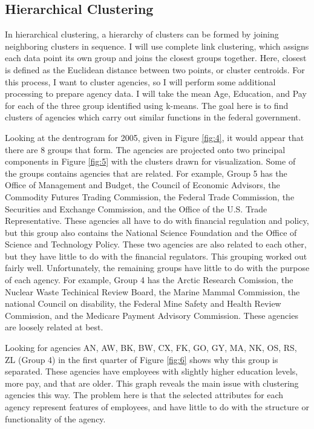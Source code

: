 \documentclass{article}
\begin{document}
    \subsection{Hierarchical Clustering}
    In hierarchical clustering, a hierarchy of clusters can be formed by joining neighboring clusters in sequence. I will use complete link clustering, which assigns each data point its own group and joins the closest groups together. Here, closest is defined as the Euclidean distance between two points, or cluster centroids. For this process, I want to cluster agencies, so I will perform some additional processing to prepare agency data. I will take the mean Age, Education, and Pay for each of the three group identified using k-means. The goal here is to find clusters of agencies which carry out similar functions in the federal government.
    \par
    Looking at the dentrogram for 2005, given in Figure \ref{fig:4}, it would appear that there are 8 groups that form. The agencies are projected onto two principal components in Figure \ref{fig:5} with the clusters drawn for visualization. Some of the groups contains agencies that are related. For example, Group 5 has the Office of Management and Budget, the Council of Economic Advisors, the Commodity Futures Trading Commission, the Federal Trade Commission, the Securities and Exchange Commission, and the Office of the U.S. Trade Representative. These agencies all have to do with financial regulation and policy, but this group also contains the National Science Foundation and the Office of Science and Technology Policy. These two agencies are also related to each other, but they have little to do with the financial regulators. This grouping worked out fairly well. Unfortunately, the remaining groups have little to do with the purpose of each agency. For example, Group 4 has the Arctic Research Comission, the Nuclear Waste Techinical Review Board, the Marine Mammal Commission, the national Council on disability, the Federal Mine Safety and Health Review Commission, and the Medicare Payment Advisory Commission. These agencies are loosely related at best.
    \par
    Looking for agencies AN, AW, BK, BW, CX, FK, GO, GY, MA, NK, OS, RS, ZL (Group 4) in the first quarter of Figure \ref{fig:6} shows why this group is separated. These agencies have employees with slightly higher education levels, more pay, and that are older. This graph reveals the main issue with clustering agencies this way. The problem here is that the selected attributes for each agency represent features of employees, and have little to do with the structure or functionality of the agency.
\end{document}
